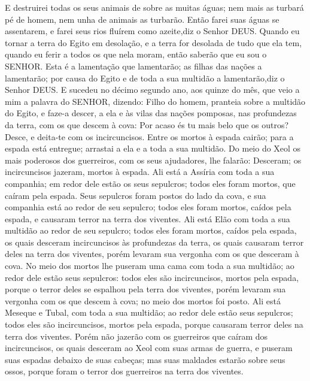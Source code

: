 {E destruirei todas os seus animais de sobre as muitas águas; nem mais as turbará pé de homem, nem unha de animais as turbarão.
Então farei suas águas se assentarem, e farei seus rios fluírem como azeite,diz o Senhor DEUS.
Quando eu tornar a terra do Egito em desolação, e a terra for desolada de tudo que ela tem,
 quando eu ferir a todos os que nela moram, então saberão que eu sou o SENHOR.
Esta é a lamentação que lamentarão; as filhas das nações a lamentarão; por causa do Egito e de toda a sua multidão a lamentarão,diz o Senhor DEUS.
E sucedeu no décimo segundo ano, aos quinze do mês, que veio a mim a palavra do SENHOR, dizendo:
Filho do homem, pranteia sobre a multidão do Egito, e faze-a descer, a ela e às vilas das nações pomposas, nas profundezas da terra, com os que descem à cova:
Por acaso és tu mais belo que os outros? Desce, e deita-te com os incircuncisos.
Entre os mortos à espada cairão; para a espada está entregue; arrastai a ela
 e a toda a sua multidão.
Do meio do Xeol
 os mais poderosos dos guerreiros, com os seus ajudadores, lhe falarão: Desceram; os incircuncisos jazeram, mortos à espada.
Ali está a Assíria com toda a sua companhia; em redor dele estão os seus sepulcros; todos eles foram mortos, que caíram pela espada.
Seus sepulcros foram postos do lado da cova, e sua companhia está ao redor de seu sepulcro; todos eles foram mortos, caídos pela espada, e causaram terror na terra dos viventes.
Ali está Elão com toda a sua multidão ao redor de seu sepulcro; todos eles foram mortos, caídos pela espada, os quais desceram incircuncisos às profundezas da terra, os quais causaram terror deles na terra dos viventes, porém levaram sua vergonha com os que desceram à cova.
No meio dos mortos lhe puseram uma cama com toda a sua multidão; ao redor dele estão seus sepulcros: todos eles são incircuncisos, mortos pela espada, porque o terror deles se espalhou pela terra dos viventes, porém levaram sua vergonha com os que descem à cova; no meio dos mortos foi posto.
Ali está Meseque e Tubal, com toda a sua multidão; ao redor dele estão seus sepulcros; todos eles são incircuncisos, mortos pela espada, porque causaram terror deles na terra dos viventes.
Porém não jazerão com os guerreiros que caíram dos incircuncisos, os quais desceram ao Xeol com suas armas de guerra, e puseram suas espadas debaixo de suas cabeças; mas suas maldades estarão sobre seus ossos, porque foram o terror dos guerreiros na terra dos viventes.
}
